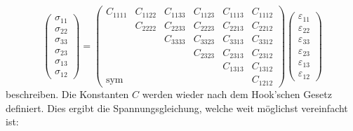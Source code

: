 \[
\begin{pmatrix}
	\sigma_{11} \\
	\sigma_{22} \\
	\sigma_{33} \\
	\sigma_{23} \\
	\sigma_{13} \\
	\sigma_{12}
\end{pmatrix}
=
\begin{pmatrix}
	  C_{1111} & C_{1122} & C_{1133} & C_{1123} & C_{1113} & C_{1112} \\
	           & C_{2222} & C_{2233} & C_{2223} & C_{2213} & C_{2212} \\
	           &          & C_{3333} & C_{3323} & C_{3313} & C_{3312} \\ 
	           &          &          & C_{2323} & C_{2313} & C_{2312} \\ 
               &          &          &          & C_{1313} & C_{1312} \\
    \text{sym} &          &          &          &          & C_{1212} 
\end{pmatrix}
\begin{pmatrix}
	\varepsilon_{11} \\
	\varepsilon_{22} \\
	\varepsilon_{33} \\
	\varepsilon_{23} \\
	\varepsilon_{13} \\
	\varepsilon_{12}
\end{pmatrix}
\]
beschreiben.
Die Konstanten $C$ werden wieder nach dem Hook'schen Gesetz definiert.
Dies ergibt die Spannungsgleichung, welche weit möglichst vereinfacht ist:
